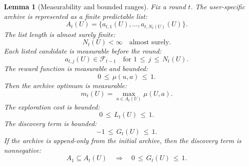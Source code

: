 \documentclass{article} %
\newtheorem{lemma}[theorem]{Lemma}
\begin{document}
\begin{lemma}[Measurability and bounded ranges]
\label{lem:5}
Fix a round \(t\).  The user-specific archive is represented as a finite predictable list:
\begin{equation}
\label{eq:app-fifth-archive-list}
A_t(U)
=
\{a_{t,1}(U),\ldots,a_{t,N_t(U)}(U)\}.
\end{equation}
The list length is almost surely finite:
\begin{equation}
\label{eq:app-fifth-finite-length}
N_t(U)<\infty
\quad
\text{almost surely}.
\end{equation}
Each listed candidate is measurable before the round:
\begin{equation}
\label{eq:app-fifth-predictable-candidate}
a_{t,j}(U)
\in
\mathcal{F}_{t-1}
\quad
\text{for }1\,\le\, j\,\le\, N_t(U).
\end{equation}
The reward function is measurable and bounded:
\begin{equation}
\label{eq:app-fifth-mu-bounded}
0\,\le\, \mu(u,a)\,\le\, 1.
\end{equation}
Then the archive optimum is measurable:
\begin{equation}
\label{eq:app-fifth-mt-measurable}
m_t(U)
=
\max_{a\in A_t(U)}\mu(U,a).
\end{equation}
The exploration cost is bounded:
\begin{equation}
\label{eq:app-fifth-lt-range}
0\,\le\, L_t(U)\,\le\, 1.
\end{equation}
The discovery term is bounded:
\begin{equation}
\label{eq:app-fifth-gt-range}
-1\,\le\, G_t(U)\,\le\, 1.
\end{equation}
If the archive is append-only from the initial archive, then the discovery term is nonnegative:
\begin{equation}
\label{eq:app-fifth-append-nonnegative}
A_1\subseteq A_t(U)
\quad
\Longrightarrow
\quad
0\,\le\, G_t(U)\,\le\, 1.
\end{equation}
\end{lemma}
\end{document}
